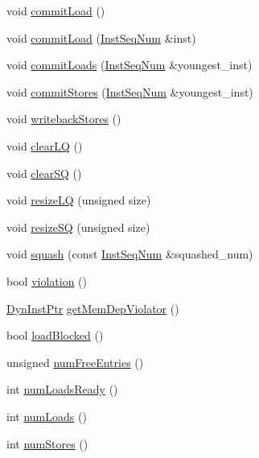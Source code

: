 \begin{DoxyCompactItemize}
void \hyperlink{classOzoneLSQ_a8ddd26e169a62ec5ae591a9f95934839}{commitLoad} ()
\item 
void \hyperlink{classOzoneLSQ_a1201888477c271cea802f0be0081d76b}{commitLoad} (\hyperlink{inst__seq_8hh_a258d93d98edaedee089435c19ea2ea2e}{InstSeqNum} \&inst)
\item 
void \hyperlink{classOzoneLSQ_a1ae517a923a864a4e3a5aa1eeb2dd2d6}{commitLoads} (\hyperlink{inst__seq_8hh_a258d93d98edaedee089435c19ea2ea2e}{InstSeqNum} \&youngest\_\-inst)
\item 
void \hyperlink{classOzoneLSQ_a954ce1ce58b67cae49ba127d5ea40701}{commitStores} (\hyperlink{inst__seq_8hh_a258d93d98edaedee089435c19ea2ea2e}{InstSeqNum} \&youngest\_\-inst)
\item 
void \hyperlink{classOzoneLSQ_a5f04e29d6f6feb8b86460491f2ba7547}{writebackStores} ()
\item 
void \hyperlink{classOzoneLSQ_ae3af532345dbe6519e8272d9cd677230}{clearLQ} ()
\item 
void \hyperlink{classOzoneLSQ_a171cd7891063f418b1ee217f5c03537b}{clearSQ} ()
\item 
void \hyperlink{classOzoneLSQ_a3bc9500810cb2d5615e29206e2d6499f}{resizeLQ} (unsigned size)
\item 
void \hyperlink{classOzoneLSQ_a341dd6a3bd8d240659fd9d698c3b5c65}{resizeSQ} (unsigned size)
\item 
void \hyperlink{classOzoneLSQ_a51dd7e304d5413447717826fac6f4921}{squash} (const \hyperlink{inst__seq_8hh_a258d93d98edaedee089435c19ea2ea2e}{InstSeqNum} \&squashed\_\-num)
\item 
bool \hyperlink{classOzoneLSQ_a4f720bbfb5fdefdb23516500eeb0b4de}{violation} ()
\item 
\hyperlink{classOzoneLSQ_a028ce10889c5f6450239d9e9a7347976}{DynInstPtr} \hyperlink{classOzoneLSQ_a30adaf6f5fb6b38b5747f35c419e3f31}{getMemDepViolator} ()
\item 
bool \hyperlink{classOzoneLSQ_a05c413ba417c6453e99f75d87c958590}{loadBlocked} ()
\item 
unsigned \hyperlink{classOzoneLSQ_a028971a565aca048c67ea1c36a6a9d51}{numFreeEntries} ()
\item 
int \hyperlink{classOzoneLSQ_a9aa5d5a61b2229931008ac2ea802a3ab}{numLoadsReady} ()
\item 
int \hyperlink{classOzoneLSQ_a54460b759fb06e2b18e26657279a6f49}{numLoads} ()
\item 
int \hyperlink{classOzoneLSQ_aa0fc32a4a9d77696f5907f4d25e7d07f}{numStores} ()
\item 

\end{DoxyCompactItemize}
